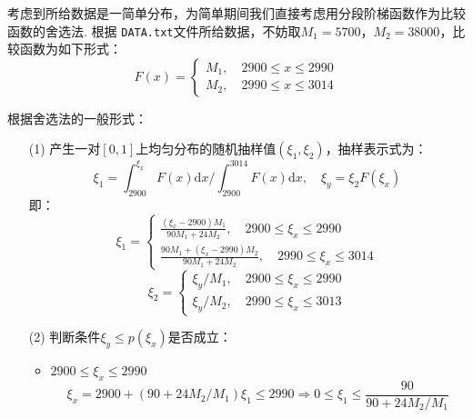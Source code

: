 \documentclass[12pt,a4paper,utf8]{ctexart}
\begin{document}
考虑到所给数据是一简单分布，为简单期间我们直接考虑用分段阶梯函数作为比较函数的舍选法.
根据 \texttt{DATA.txt}文件所给数据，不妨取$M_1 = 5700$，$M_2 =
38000$，比较函数为如下形式：
\begin{equation}
    F(x) = 
    \begin{cases}
        M_1,\quad 2900 \leq x \leq 2990 \\
        M_2,\quad 2990 \leq x \leq 3014
    \end{cases}
\end{equation}

根据舍选法的一般形式：
\begin{enumerate}
    \item[(1)] 产生一对$[0,1]$上均匀分布的随机抽样值$(\xi_1,
        \xi_2)$，抽样表示式为：
        \begin{equation}
            \xi_1 = \int _{2900} ^{\xi_x} F(x) \textrm{d}x \big/ \int _{2900}
            ^{3014} F(x)
            \textrm{d}x,\quad \xi_y = \xi_2 F(\xi_x) 	 	
        \end{equation}
        即：
        \begin{equation}
            \xi_1 = 
            \begin{cases}
                \frac{(\xi_x - 2900)M_1}{90M_1 + 24M_2},\quad 2900 \leq \xi_x \leq 2990
                \\
                \frac{90M_1 + (\xi_x - 2990)M_2}{90M_1 + 24M_2},\quad 2990 \leq
                \xi_x \leq 3014
            \end{cases}
        \end{equation}
        \begin{equation}
            \xi_2 =
            \begin{cases}
                \xi_y / M_1,\quad 2900 \leq \xi_x \leq 2990 \\
                \xi_y / M_2,\quad 2990 \leq \xi_x \leq 3013
            \end{cases}
        \end{equation}
    \item[(2)]判断条件$\xi_y \leq p(\xi_x)$是否成立：
        \begin{itemize}
            \item $2900 \leq \xi_x \leq 2990$
            \begin{equation}
                \xi_x = 2900 + (90 + 24M_2/M_1)\xi_1 \leq 2990 \Rightarrow 0
                \leq \xi_1
                \leq \frac{90}{90 + 24M_2/M_1}
            \end{equation}
            

\end{itemize}
\end{enumerate}
\end{document}
